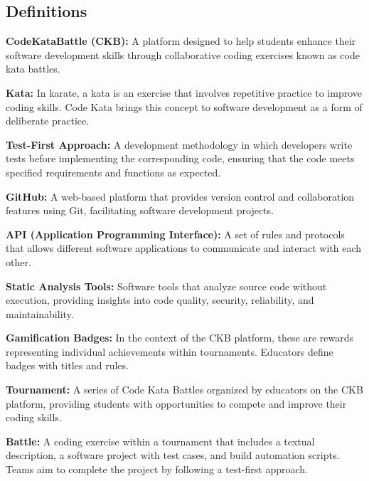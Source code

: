 \subsection{Definitions}
\begin{description}[labelwidth=4em, style=nextline]

    \item \textbf{CodeKataBattle (CKB):} A platform designed to help students enhance their software development skills through collaborative coding exercises known as code kata battles.

    \item \textbf{Kata:} In karate, a kata is an exercise that involves repetitive practice to improve coding skills. Code Kata brings this concept to software development as a form of deliberate practice.

    \item \textbf{Test-First Approach:} A development methodology in which developers write tests before implementing the corresponding code, ensuring that the code meets specified requirements and functions as expected.

    \item \textbf{GitHub:} A web-based platform that provides version control and collaboration features using Git, facilitating software development projects. \cite{GitHub}

    \item \textbf{API (Application Programming Interface):} A set of rules and protocols that allows different software applications to communicate and interact with each other.

    \item \textbf{Static Analysis Tools:} Software tools that analyze source code without execution, providing insights into code quality, security, reliability, and maintainability.

    \item \textbf{Gamification Badges:} In the context of the CKB platform, these are rewards representing individual achievements within tournaments. Educators define badges with titles and rules.

    \item \textbf{Tournament:} A series of Code Kata Battles organized by educators on the CKB platform, providing students with opportunities to compete and improve their coding skills.

    \item \textbf{Battle:} A coding exercise within a tournament that includes a textual description, a software project with test cases, and build automation scripts. Teams aim to complete the project by following a test-first approach.


\end{description}
